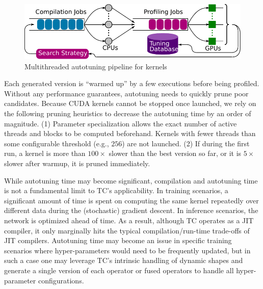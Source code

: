 \begin{figure}[h!tb]
  \centering
  \includegraphics[width=.6\columnwidth]{extra/autotuner.pdf}
  \caption{Multithreaded autotuning pipeline for kernels}
  \label{fig:comp_work_queue}
\end{figure}

%

Each generated version is ``warmed up'' by a few
executions before being profiled.  Without any performance guarantees,
autotuning needs to quickly prune poor candidates.  Because CUDA
kernels cannot be stopped once launched,
we rely on the following pruning heuristics to decrease the
autotuning time by an order of magnitude. (1) Parameter specialization
allows the exact number of active threads and blocks to be computed beforehand.
Kernels with fewer threads than some configurable threshold (e.g., $256$) are
not launched. (2) If during the first run, a kernel is more
than $100\times$ slower than the best version so far, or it is $5\times$ slower
after warmup, it is pruned immediately.

While autotuning time may become significant, compilation and
autotuning time is not a fundamental limit to TC's applicability.  In
training scenarios, a significant amount of time is spent on computing
the same kernel repeatedly over different data during the (stochastic)
gradient descent.  In inference scenarios, the network is optimized
ahead of time. As a result, although TC operates as a JIT compiler, it
only marginally hits the typical compilation/run-time trade-offs of
JIT compilers. Autotuning time may become an issue in specific
training scenarios where hyper-parameters would need to be frequently
updated, but in such a case one may leverage TC's intrinsic handling
of dynamic shapes and generate a single version of each operator or
fused operators to handle all hyper-parameter configurations.

